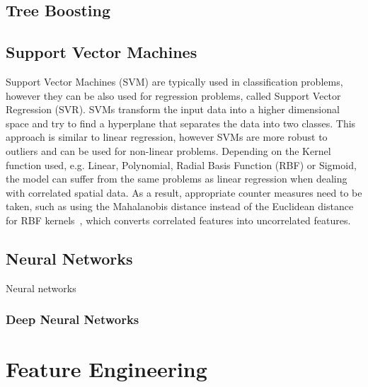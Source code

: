 \subsection{Tree Boosting}


\subsection{Support Vector Machines}

Support Vector Machines (SVM) are typically used in classification problems, however they can be also used for regression problems, called Support Vector Regression (SVR). SVMs transform the input data into a higher dimensional space and try to find a hyperplane that separates the data into two classes. This approach is similar to linear regression, however SVMs are more robust to outliers and can be used for non-linear problems. Depending on the Kernel function used, e.g. Linear, Polynomial, Radial Basis Function (RBF) or Sigmoid, the model can suffer from the same problems as linear regression when dealing with correlated spatial data.
As a result, appropriate counter measures need to be taken, such as using the Mahalanobis distance instead of the Euclidean distance for RBF kernels~\cite{kamada2006support}, which converts correlated features into uncorrelated features.

\subsection{Neural Networks}

Neural networks 

\subsubsection{Deep Neural Networks}


\section{Feature Engineering}

